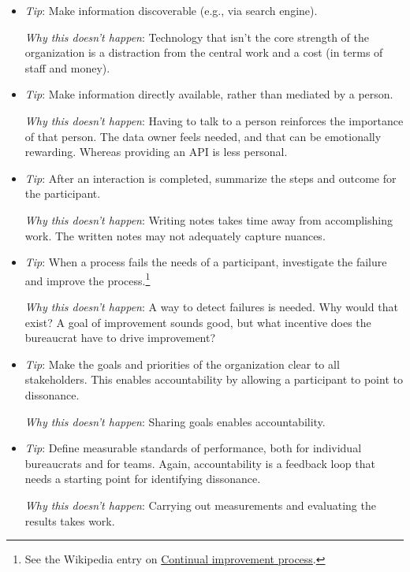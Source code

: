 \begin{itemize}
    \item \textit{Tip}: Make information discoverable (e.g., via search engine).

    \textit{Why this doesn't happen}: Technology that isn't the core strength of the organization is a distraction from the central work and a cost (in terms of staff and money).
    
    \item \textit{Tip}: Make information directly available, rather than mediated by a person. 

    \textit{Why this doesn't happen}: Having to talk to a person reinforces the importance of that person. The data owner feels needed, and that can be emotionally rewarding. Whereas providing an API is less personal. 
    
    \item \textit{Tip}: After an interaction is completed, summarize the steps and outcome for the participant. 

    \textit{Why this doesn't happen}: Writing notes takes time away from accomplishing work. The written notes may not adequately capture nuances.
    
    \item \textit{Tip}: When a process fails the needs of a participant, investigate the failure and improve the process.\footnote{See the Wikipedia entry on \href{https://en.wikipedia.org/wiki/Continual_improvement_process}{Continual improvement process}.}    

    \textit{Why this doesn't happen}: A way to detect failures is needed. Why would that exist? A goal of improvement sounds good, but what incentive does the bureaucrat have to drive improvement?
    
    \item \textit{Tip}: Make the goals and priorities of the organization clear to all stakeholders. This enables accountability by allowing a participant to point to dissonance.  

    \textit{Why this doesn't happen}: Sharing goals enables accountability. 
    
    \item \textit{Tip}: Define measurable standards of performance, both for individual bureaucrats and for teams. Again, accountability is a feedback loop that needs a starting point for identifying dissonance.

    \textit{Why this doesn't happen}: Carrying out measurements and evaluating the results takes work. 
    

\end{itemize}

